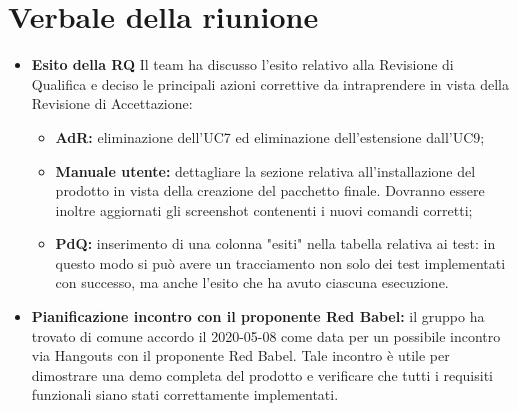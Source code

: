 \section{Verbale della riunione}
	\begin{itemize}
		\item \textbf{Esito della RQ}
		Il team ha discusso l'esito relativo alla Revisione di Qualifica e deciso le principali azioni correttive da intraprendere in vista della Revisione di Accettazione:
		\begin{itemize}
			\item \textbf{AdR:} eliminazione dell'UC7 ed eliminazione dell'estensione dall'UC9;
			\item \textbf{Manuale utente:} dettagliare la sezione relativa all'installazione del prodotto in vista della creazione del pacchetto finale. Dovranno essere inoltre aggiornati gli screenshot contenenti i nuovi comandi corretti;
			\item \textbf{PdQ:} inserimento di una colonna "esiti" nella tabella relativa ai test: in questo modo si può avere un tracciamento non solo dei test implementati con successo, ma anche l'esito che ha avuto ciascuna esecuzione.
		\end{itemize}
		\item \textbf{Pianificazione incontro con il proponente Red Babel:} il gruppo ha trovato di comune accordo il 2020-05-08 come data per un possibile incontro via Hangouts con il proponente Red Babel. Tale incontro è utile per dimostrare una demo completa del prodotto e verificare che tutti i requisiti funzionali siano stati correttamente implementati.
	\end{itemize}
